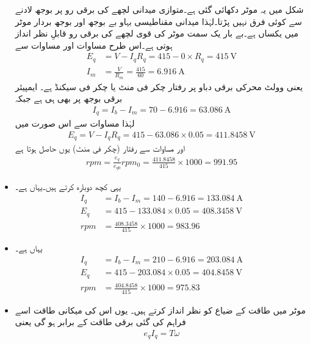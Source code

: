 \begin{itemize}
شکل  میں یہ موٹر دکھائی گئی ہے۔متوازی میدانی لچھے کی برقی رو پر بوجھ لادنے سے کوئی فرق نہیں پڑتا۔لہٰذا میدانی مقناطیسی بہاو بے بوجھ اور بوجھ بردار موٹر میں یکساں ہے۔بے بار یک سمت  موٹر کی قوی لچھے کی برقی رو   قابلِ نظر انداز ہوتی ہے۔اس طرح مساوات   اور مساوات   سے  
\begin{align*}
E_q&=V-I_q R_q=415-0\times R_q=\SI{415}{\volt}\\
I_m&=\frac{V}{R_m}=\frac{415}{60}=\SI{6.916}{\ampere}
\end{align*}
یعنی  وولٹ محرکی برقی دباو پر رفتار  چکر فی منٹ یا  چکر فی سیکنڈ ہے۔ ایمپیئر برقی بوجھ پر بھی  ہی ہے جبکہ 
\begin{align*}
I_q=I_b-I_m=70-6.916=\SI{63.086}{\ampere}
\end{align*}
لہٰذا مساوات   سے اس صورت میں
\begin{align*}
E_q=V-I_q R_q=415-63.086 \times 0.05=\SI{411.8458}{\volt}
\end{align*}
اور مساوات   سے رفتار (چکر فی منٹ) یوں حاصل ہوتا ہے
\begin{align*}
rpm=\frac{e_q}{e_{q0}} rpm_0=\frac{411.8458}{415} \times 1000=991.95
\end{align*}
%
\item
یہی کچھ دوبارہ کرتے ہیں۔یہاں  ہے۔
\begin{align*}
I_q&=I_b-I_m=140-6.916=\SI{133.084}{\ampere}\\
E_q&=415-133.084 \times 0.05=\SI{408.3458}{\volt}\\
rpm&=\frac{408.3458}{415} \times 1000=983.96
\end{align*}
%
\item
یہاں  ہے۔
\begin{align*}
I_q&=I_b-I_m=210-6.916=\SI{203.084}{\ampere}\\
E_q&=415-203.084 \times 0.05=\SI{404.8458}{\volt}\\
rpm&=\frac{404.8458}{415} \times 1000=975.83
\end{align*}
%
\item
موٹر میں طاقت کے ضیاع کو نظر انداز کرتے ہیں۔ یوں اس کی میکانی طاقت اسے فراہم کی گئی برقی طاقت کے برابر ہو گی یعنی
\begin{align}
e_q I_q=T \omega
\end{align}

\end{itemize}
